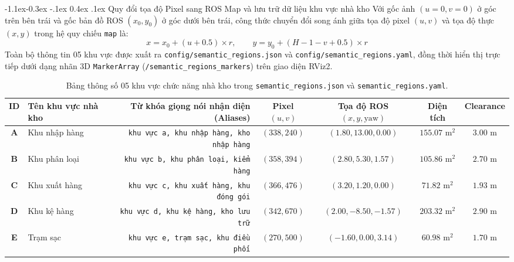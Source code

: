 \documentclass[10pt,a4paper]{article}
\makeatletter
\renewcommand{\subsection}{\@startsection{subsection}{2}{\z@}%
  {-1.1ex\@plus -0.3ex \@minus -.1ex}%
  {0.4ex \@plus .1ex}%
  {\normalfont\small\bfseries\color{secondary}}}
\makeatother
\begin{document}
\subsection{Quy đổi tọa độ Pixel sang ROS Map và lưu trữ dữ liệu khu vực nhà kho}
Với gốc ảnh $(u=0, v=0)$ ở góc trên bên trái và gốc bản đồ ROS $(x_0, y_0)$ ở góc dưới bên trái, công thức chuyển đổi song ánh giữa tọa độ pixel $(u, v)$ và tọa độ thực $(x, y)$ trong hệ quy chiếu \texttt{map} là:
\begin{equation}
  x = x_0 + (u + 0.5) \times r, \qquad y = y_0 + (H - 1 - v + 0.5) \times r
\end{equation}
Toàn bộ thông tin 05 khu vực được xuất ra \texttt{config/semantic\_regions.json} và \texttt{config/semantic\_regions.yaml}, đồng thời hiển thị trực tiếp dưới dạng nhãn 3D \texttt{MarkerArray} (\texttt{/semantic\_regions\_markers}) trên giao diện RViz2.

\vspace{-3pt}
\begin{table}[H]
  \centering
  \scriptsize
  \caption{\footnotesize Bảng thông số 05 khu vực chức năng nhà kho trong \texttt{semantic\_regions.json} và \texttt{semantic\_regions.yaml}.}
  \vspace{-3pt}
  \renewcommand{\arraystretch}{1.10}
  \begin{tabularx}{\textwidth}{c l R c c c c}
    \toprule
    \textbf{ID} & \textbf{Tên khu vực nhà kho} & \textbf{Từ khóa giọng nói nhận diện (Aliases)} & \textbf{Pixel $(u, v)$} & \textbf{Tọa độ ROS $(x, y, \text{yaw})$} & \textbf{Diện tích} & \textbf{Clearance} \\
    \midrule
    \textbf{A} & Khu nhập hàng & \texttt{khu vực a, khu nhập hàng, kho nhập hàng} & $(338, 240)$ & $(1.80, 13.00, 0.00)$ & $155.07\text{ m}^2$ & $3.00\text{ m}$ \\
    \textbf{B} & Khu phân loại & \texttt{khu vực b, khu phân loại, kiểm hàng} & $(358, 394)$ & $(2.80, 5.30, 1.57)$ & $105.86\text{ m}^2$ & $2.70\text{ m}$ \\
    \textbf{C} & Khu xuất hàng & \texttt{khu vực c, khu xuất hàng, khu đóng gói} & $(366, 476)$ & $(3.20, 1.20, 0.00)$ & $71.82\text{ m}^2$ & $1.93\text{ m}$ \\
    \textbf{D} & Khu kệ hàng & \texttt{khu vực d, khu kệ hàng, kho lưu trữ} & $(342, 670)$ & $(2.00, -8.50, -1.57)$ & $203.32\text{ m}^2$ & $2.90\text{ m}$ \\
    \textbf{E} & Trạm sạc & \texttt{khu vực e, trạm sạc, khu điều phối} & $(270, 500)$ & $(-1.60, 0.00, 3.14)$ & $60.98\text{ m}^2$ & $1.70\text{ m}$ \\
    \bottomrule
  \end{tabularx}
\end{table}
\vspace{-4pt}
\end{document}
